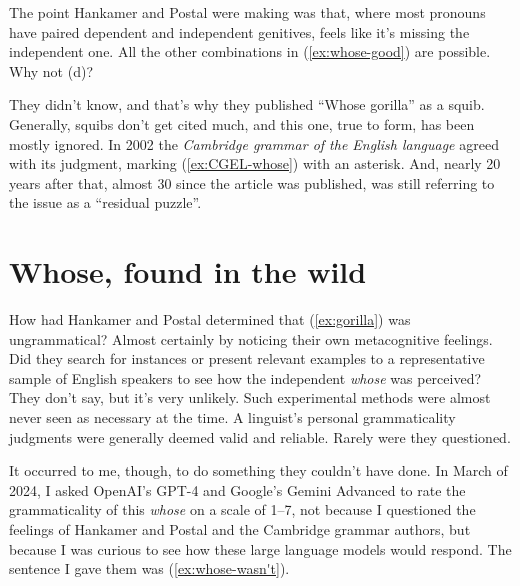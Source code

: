 The point Hankamer and Postal were making was that, where most pronouns have paired dependent and independent genitives,  feels like it's missing the independent one. All the other combinations in (\ref{ex:whose-good}) are possible. Why not (d)?

\ea \label{ex:whose-good}
 \z
\z

They didn't know, and that's why they published \enquote{Whose gorilla} as a squib. Generally, squibs don't get cited much, and this one, true to form, has been mostly ignored. In 2002 the \textit{Cambridge grammar of the English language} agreed with its judgment, marking (\ref{ex:CGEL-whose}) with an asterisk. And, nearly 20 years after that, almost 30 since the article was published, \citet{Cinque2020a} was still referring to the issue as a \enquote{residual puzzle}.

\label{ex:CGEL-whose}
\z

\section{Whose, found in the wild}

How had Hankamer and Postal determined that (\ref{ex:gorilla}) was ungrammatical? Almost certainly by noticing their own metacognitive feelings. Did they search for instances or present relevant examples to a representative sample of English speakers to see how the independent \textit{whose} was perceived? They don't say, but it's very unlikely. Such experimental methods were almost never seen as necessary at the time. A linguist's personal  grammaticality judgments were generally deemed valid and reliable. Rarely were they questioned.

It occurred to me, though, to do something they couldn't have done. In March of 2024, I asked OpenAI's GPT-4 and Google's Gemini Advanced to rate the grammaticality of this \textit{whose} on a scale of 1--7, not because I questioned the feelings of Hankamer and Postal and the Cambridge grammar authors, but because I was curious to see how these large language models would respond. The sentence I gave them was (\ref{ex:whose-wasn't}).

